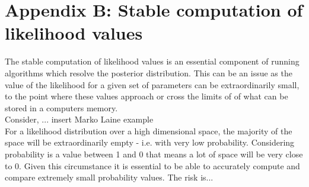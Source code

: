 \chapter{Appendix B: Stable computation of likelihood values}
\label{AppendixB}

The stable computation of likelihood values is an essential component of running algorithms which resolve the posterior distribution. This can be an issue as the value of the likelihood for a given set of parameters can be extraordinarily small, to the point where these values approach or cross the limits of of what can be stored in a computers memory. \\

Consider, ... insert Marko Laine example\\

For a likelihood distribution over a high dimensional space, the majority of the space will be extraordinarily empty - i.e. with very low probability. Considering probability is a value between 1 and 0 that means a lot of space will be very close to 0. Given this circumstance it is essential to be able to accurately compute and compare extremely small probability values. The risk is...